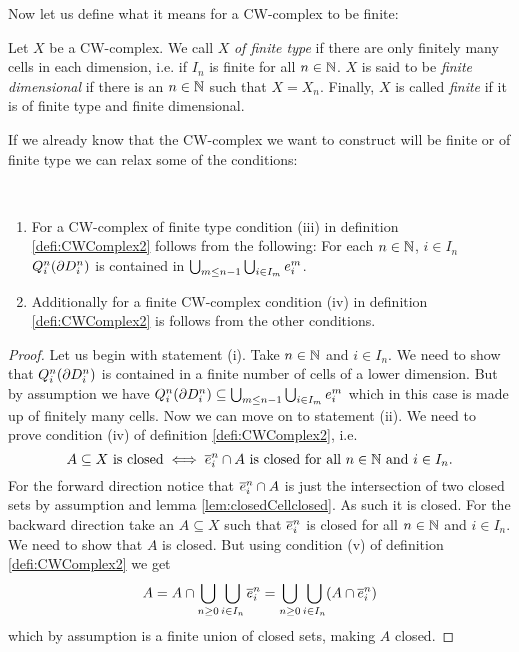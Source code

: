 Now let us define what it means for a CW-complex to be finite:

\begin{defi}
    Let $X$ be a CW-complex.
    We call $X$ \emph{of finite type} if there are only finitely many cells in each dimension, i.e. if $I_n$ is finite for all $n \in \bN$.
    $X$ is said to be \emph{finite dimensional} if there is an $n \in \bN$ such that $X = X_n$.
    Finally, $X$ is called \emph{finite} if it is of finite type and finite dimensional.
\end{defi}

If we already know that the CW-complex we want to construct will be finite or of finite type we can relax some of the conditions:

\begin{rem}~
    \begin{enumerate}
        \item For a CW-complex of finite type condition (iii) in definition \ref{defi:CWComplex2} follows from the following:
        For each $n \in \bN$, $i \in I_n$ $Q_i^n(\boundary D_i^n)$ is contained in $\bigcup_{m \le n - 1}\bigcup_{i \in I_m}\openCell{m}{i}$.
        \item Additionally for a finite CW-complex condition (iv) in definition \ref{defi:CWComplex2} is follows from the other conditions.
    \end{enumerate}
\end{rem}
\begin{proof}
    Let us begin with statement (i).
    Take $n \in \bN$ and $i \in I_n$.
    We need to show that $Q_i^n(\boundary D_i^n)$ is contained in a finite number of cells of a lower dimension.
    But by assumption we have $Q_i^n(\boundary D_i^n) \subseteq \bigcup_{m \le n - 1}\bigcup_{i \in I_m}\openCell{m}{i}$ which in this case is made up of finitely many cells.
    Now we can move on to statement (ii).
    We need to prove condition (iv) of definition \ref{defi:CWComplex2}, i.e.
    \[A \subseteq X \text{ is closed} \iff \closedCell{n}{i} \cap A \text{ is closed for all } n \in \bN \text{ and } i \in I_n.\]
    For the forward direction notice that $\closedCell{n}{i} \cap A$ is just the intersection of two closed sets by assumption and lemma \ref{lem:closedCellclosed}.
    As such it is closed.
    For the backward direction take an $A \subseteq X$ such that $\closedCell{n}{i}$ is closed for all $n \in \bN$ and $i \in I_n$.
    We need to show that $A$ is closed.
    But using condition (v) of definition \ref{defi:CWComplex2} we get
    \[A = A \cap \bigcup_{n \ge 0}\bigcup_{i \in I_n} \closedCell{n}{i} = \bigcup_{n \ge 0}\bigcup_{i \in I_n} (A \cap \closedCell{n}{i})\]
    which by assumption is a finite union of closed sets, making $A$ closed.
\end{proof}

